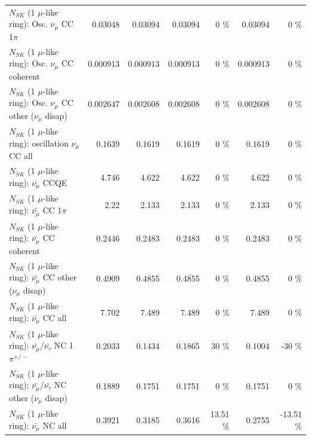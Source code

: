 \begin{table}
\begin{tabular}{| l | r | r | r  r | r  r |}
                          $N_{SK}$ (1 $\mu$-like ring): Osc. $\nu_\mu$ CC 1$\pi$ &         0.03048 &         0.03094 &         0.03094 &        0 \%  &         0.03094 &        0 \%  \\ 
                        $N_{SK}$ (1 $\mu$-like ring): Osc. $\nu_\mu$ CC coherent &        0.000913 &        0.000913 &        0.000913 &        0 \%  &        0.000913 &        0 \%  \\ 
         $N_{SK}$ (1 $\mu$-like ring): Osc. $\nu_\mu$ CC other ($\nu_\mu$ disap) &        0.002647 &        0.002608 &        0.002608 &        0 \%  &        0.002608 &        0 \%  \\ 
                      $N_{SK}$ (1 $\mu$-like ring): oscillation $\nu_\mu$ CC all &          0.1639 &          0.1619 &          0.1619 &        0 \%  &          0.1619 &        0 \%  \\ 
\hline
\hline
                              $N_{SK}$ (1 $\mu$-like ring): $\bar{\nu_\mu}$ CCQE &           4.746 &           4.622 &           4.622 &        0 \%  &           4.622 &        0 \%  \\ 
                         $N_{SK}$ (1 $\mu$-like ring): $\bar{\nu_\mu}$ CC 1$\pi$ &            2.22 &           2.133 &           2.133 &        0 \%  &           2.133 &        0 \%  \\ 
                       $N_{SK}$ (1 $\mu$-like ring): $\bar{\nu_\mu}$ CC coherent &          0.2446 &          0.2483 &          0.2483 &        0 \%  &          0.2483 &        0 \%  \\ 
        $N_{SK}$ (1 $\mu$-like ring): $\bar{\nu_\mu}$ CC other ($\nu_\mu$ disap) &          0.4909 &          0.4855 &          0.4855 &        0 \%  &          0.4855 &        0 \%  \\ 
                          $N_{SK}$ (1 $\mu$-like ring): $\bar{\nu_{\mu}}$ CC all &           7.702 &           7.489 &           7.489 &        0 \%  &           7.489 &        0 \%  \\ 
\hline
  $N_{SK}$ (1 $\mu$-like ring): $\bar{\nu_\mu}$/$\bar{\nu_\tau}$ NC 1$\pi^{+/-}$ &          0.2033 &          0.1434 &          0.1865 &       30 \%  &          0.1004 &      -30 \%  \\ 
$N_{SK}$ (1 $\mu$-like ring): $\bar{\nu_\mu}$/$\bar{\nu_\tau}$ NC other ($\nu_\mu$ disap) &          0.1889 &          0.1751 &          0.1751 &        0 \%  &          0.1751 &        0 \%  \\ 
                          $N_{SK}$ (1 $\mu$-like ring): $\bar{\nu_{\mu}}$ NC all &          0.3921 &          0.3185 &          0.3616 &    13.51 \%  &          0.2755 &   -13.51 \%  \\ 

\end{tabular}
\end{table}
